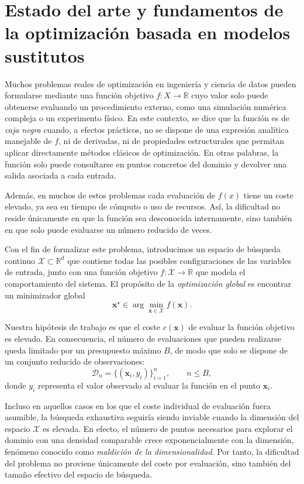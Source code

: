 \chapter{Estado del arte y fundamentos de la optimización basada en modelos sustitutos}
\label{chap:estado_arte}

Muchos problemas reales de optimización en ingeniería y ciencia de datos pueden formularse mediante una función objetivo $f : X \to \mathbb{R}$ cuyo valor solo puede obtenerse evaluando un procedimiento externo, como una simulación numérica compleja o un experimento físico. En este contexto, se dice que la función es de \textit{caja negra} cuando, a efectos prácticos, no se dispone de una expresión analítica manejable de $f$, ni de derivadas, ni de propiedades estructurales que permitan aplicar directamente métodos clásicos de optimización. En otras palabras, la función solo puede consultarse en puntos concretos del dominio y devolver una salida asociada a cada entrada.

Además, en muchos de estos problemas cada evaluación de $f(x)$ tiene un coste elevado, ya sea en tiempo de cómputo o uso de recursos. Así, la dificultad no reside únicamente en que la función sea desconocida internamente, sino también en que solo puede evaluarse un número reducido de veces.


\vspace{0.3cm}
Con el fin de formalizar este problema, introducimos un espacio de búsqueda continuo $\mathcal{X}\subset\mathbb{R}^{d}$ que contiene todas las posibles configuraciones de las variables de entrada, junto con una función objetivo $f:\mathcal{X}\to\mathbb{R}$ que modela el comportamiento del sistema. El propósito de la \emph{optimización global} es encontrar un minimizador global
\[
\bm{x}^{\star} \in \arg\min_{\bm{x}\in\mathcal{X}} f(\bm{x}).
\]

Nuestra hipótesis de trabajo es que el coste $c(\bm{x})$ de evaluar la función objetivo es elevado. En consecuencia, el número de evaluaciones que pueden realizarse queda limitado por un presupuesto máximo $B$, de modo que solo se dispone de un conjunto reducido de observaciones:
\[
\mathcal{D}_n = \{(\bm{x}_i, y_i)\}_{i=1}^{n}, \qquad n \leq B,
\]
donde $y_i$ representa el valor observado al evaluar la función en el punto $\bm{x}_i$.

Incluso en aquellos casos en los que el coste individual de evaluación fuera asumible, la búsqueda exhaustiva seguiría siendo inviable cuando la dimensión del espacio $\mathcal{X}$ es elevada. En efecto, el número de puntos necesarios para explorar el dominio con una densidad comparable crece exponencialmente con la dimensión, fenómeno conocido como \emph{maldición de la dimensionalidad}. Por tanto, la dificultad del problema no proviene únicamente del coste por evaluación, sino también del tamaño efectivo del espacio de búsqueda. 

